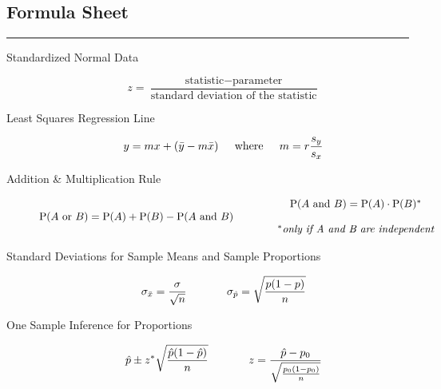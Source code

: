 \documentclass[10pt]{article}
\begin{document}
\subsection*{Formula Sheet} %
\hrule

\noindent

\begin{description}

\item[Standardized Normal Data]
$$z = \frac{\text{statistic} - \text{parameter}}{\text{standard deviation of the statistic}}$$

\item[Least Squares Regression Line] 
$$y = m x + (\bar{y}-m\bar{x})  \hspace*{0.2in} \text{where} \hspace*{0.2in}  m = r \frac{s_y}{s_x}   $$  


\item[Addition \& Multiplication Rule] 
$$\operatorname{P} (A \text{ or } B) = \operatorname{P} (A)+ \operatorname{P} (B) - \operatorname{P} (A \text{ and } B) \hspace*{0.5in} \begin{array}{c} \operatorname{P} (A \text{ and } B) = \operatorname{P} (A) \cdot \operatorname{P} (B)^* \\ ~ \\ ^*\textit{only if A and B are independent} \end{array}$$


\item[Standard Deviations for Sample Means and Sample Proportions] 
$$\sigma_{\bar{x}} = \frac{\sigma}{\sqrt{n}} \hspace*{0.5in} \sigma_{\hat{p}} = \sqrt{\frac{p(1-p)}{n} }$$


\item[One Sample Inference for Proportions]
$$\displaystyle \hat{p} \pm z^* \sqrt{\frac{\hat{p}(1-\hat{p})}{n}}  \hspace*{0.5in} z = \frac{\hat{p}-p_0}{\sqrt{\frac{p_0(1-p_0)}{n}}}$$



\end{description}
\end{document}
